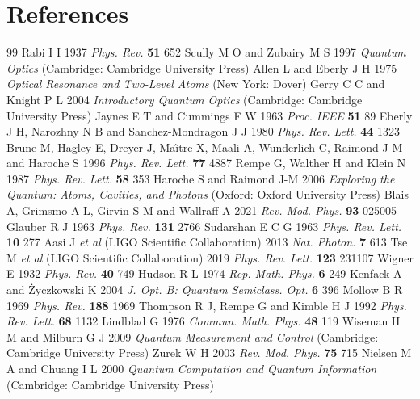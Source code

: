 \documentclass[12pt]{iopart}
\begin{document}
\section*{References}   %
\begin{thebibliography}{99}
 Rabi I I 1937 {\it Phys. Rev.} {\bf 51} 652
 Scully M O and Zubairy M S 1997 {\it Quantum Optics} (Cambridge: Cambridge University Press)
 Allen L and Eberly J H 1975 {\it Optical Resonance and Two-Level Atoms} (New York: Dover)
 Gerry C C and Knight P L 2004 {\it Introductory Quantum Optics} (Cambridge: Cambridge University Press)
 Jaynes E T and Cummings F W 1963 {\it Proc. IEEE} {\bf 51} 89
 Eberly J H, Narozhny N B and Sanchez-Mondragon J J 1980 {\it Phys. Rev. Lett.} {\bf 44} 1323
 Brune M, Hagley E, Dreyer J, Ma\^{\i}tre X, Maali A, Wunderlich C, Raimond J M and Haroche S 1996 {\it Phys. Rev. Lett.} {\bf 77} 4887
 Rempe G, Walther H and Klein N 1987 {\it Phys. Rev. Lett.} {\bf 58} 353
 Haroche S and Raimond J-M 2006 {\it Exploring the Quantum: Atoms, Cavities, and Photons} (Oxford: Oxford University Press)
 Blais A, Grimsmo A L, Girvin S M and Wallraff A 2021 {\it Rev. Mod. Phys.} {\bf 93} 025005
 Glauber R J 1963 {\it Phys. Rev.} {\bf 131} 2766
 Sudarshan E C G 1963 {\it Phys. Rev. Lett.} {\bf 10} 277
 Aasi J {\it et al} (LIGO Scientific Collaboration) 2013 {\it Nat. Photon.} {\bf 7} 613
 Tse M {\it et al} (LIGO Scientific Collaboration) 2019 {\it Phys. Rev. Lett.} {\bf 123} 231107
 Wigner E 1932 {\it Phys. Rev.} {\bf 40} 749
 Hudson R L 1974 {\it Rep. Math. Phys.} {\bf 6} 249
 Kenfack A and \.{Z}yczkowski K 2004 {\it J. Opt. B: Quantum Semiclass. Opt.} {\bf 6} 396
 Mollow B R 1969 {\it Phys. Rev.} {\bf 188} 1969
 Thompson R J, Rempe G and Kimble H J 1992 {\it Phys. Rev. Lett.} {\bf 68} 1132
 Lindblad G 1976 {\it Commun. Math. Phys.} {\bf 48} 119
 Wiseman H M and Milburn G J 2009 {\it Quantum Measurement and Control} (Cambridge: Cambridge University Press)
 Zurek W H 2003 {\it Rev. Mod. Phys.} {\bf 75} 715
 Nielsen M A and Chuang I L 2000 {\it Quantum Computation and Quantum Information} (Cambridge: Cambridge University Press)

\end{thebibliography}
\end{document}
